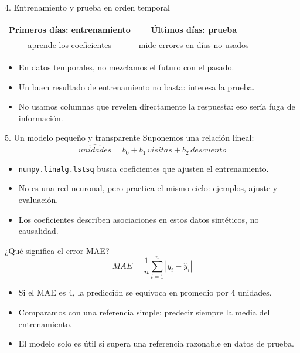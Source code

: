 \documentclass[aspectratio=169,11pt]{beamer}
\begin{document}
\begin{frame}{4. Entrenamiento y prueba en orden temporal}
  \begin{center}
    \begin{tabular}{c|c}
      \toprule
      \textbf{Primeros días: entrenamiento} & \textbf{Últimos días: prueba} \\
      \midrule
      aprende los coeficientes & mide errores en días no usados \\
      \bottomrule
    \end{tabular}
  \end{center}
  \vfill
  \begin{itemize}
    \item En datos temporales, no mezclamos el futuro con el pasado.
    \item Un buen resultado de entrenamiento no basta: interesa la prueba.
    \item No usamos columnas que revelen directamente la respuesta: eso sería fuga de información.
  \end{itemize}
\end{frame}

\begin{frame}{5. Un modelo pequeño y transparente}
  Suponemos una relación lineal:
  \[
    \widehat{unidades}=b_0+b_1\,visitas+b_2\,descuento
  \]
  \begin{itemize}
    \item \texttt{numpy.linalg.lstsq} busca coeficientes que ajusten el entrenamiento.
    \item No es una red neuronal, pero practica el mismo ciclo: ejemplos, ajuste y evaluación.
    \item Los coeficientes describen asociaciones en estos datos sintéticos, no causalidad.
  \end{itemize}
\end{frame}

\begin{frame}{¿Qué significa el error MAE?}
  \[
    MAE=\frac{1}{n}\sum_{i=1}^{n}|y_i-\hat{y}_i|
  \]
  \begin{itemize}
    \item Si el MAE es 4, la predicción se equivoca en promedio por 4 unidades.
    \item Comparamos con una referencia simple: predecir siempre la media del entrenamiento.
    \item El modelo solo es útil si supera una referencia razonable en datos de prueba.
  \end{itemize}
\end{frame}
\end{document}
